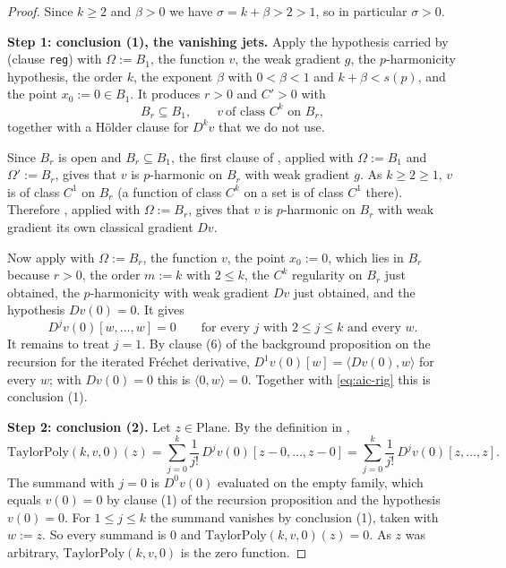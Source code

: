 \begin{proof}
Since $k\ge2$ and $\beta>0$ we have $\sigma=k+\beta>2>1$, so in particular $\sigma>0$.

\medskip\noindent\textbf{Step 1: conclusion (1), the vanishing jets.}
Apply the hypothesis carried by  (clause \texttt{reg}) with
$\Omega:=B_1$, the function $v$, the weak gradient $g$, the $p$-harmonicity hypothesis, the
order $k$, the exponent $\beta$ with $0<\beta<1$ and $k+\beta<s(p)$, and the point
$x_0:=0\in B_1$.  It produces $r>0$ and $C'>0$ with
\[
  B_r\subseteq B_1,\qquad v\ \text{of class }C^{k}\text{ on }B_r,
\]
together with a H\"older clause for $D^{k}v$ that we do not use.

Since $B_r$ is open and $B_r\subseteq B_1$, the first clause of ,
applied with $\Omega:=B_1$ and $\Omega':=B_r$, gives that $v$ is $p$-harmonic on $B_r$ with
weak gradient $g$.  As $k\ge2\ge1$, $v$ is of class $C^{1}$ on $B_r$ (a function of class
$C^{k}$ on a set is of class $C^{1}$ there).  Therefore
, applied with $\Omega:=B_r$, gives that $v$ is $p$-harmonic on
$B_r$ with weak gradient its own classical gradient $Dv$.

Now apply  with $\Omega:=B_r$, the function $v$, the point $x_0:=0$, which
lies in $B_r$ because $r>0$, the order $m:=k$ with $2\le k$, the $C^{k}$ regularity on $B_r$
just obtained, the $p$-harmonicity with weak gradient $Dv$ just obtained, and the hypothesis
$Dv(0)=0$.  It gives
\begin{equation}\label{eq:aic-rig}
  D^{j}v(0)[w,\ldots,w]=0\qquad\text{for every }j\text{ with }2\le j\le k
  \text{ and every }w .
\end{equation}
It remains to treat $j=1$.  By clause (6) of the background proposition on the recursion for
the iterated Fr\'echet derivative, $D^{1}v(0)[w]=\langle Dv(0),w\rangle$ for every $w$; with
$Dv(0)=0$ this is $\langle 0,w\rangle=0$.  Together with \eqref{eq:aic-rig} this is conclusion
(1).

\medskip\noindent\textbf{Step 2: conclusion (2).}
Let $z\in\mathrm{Plane}$.  By the definition in ,
\[
  \mathrm{TaylorPoly}(k,v,0)(z)=\sum_{j=0}^{k}\frac{1}{j!}\,D^{j}v(0)[z-0,\ldots,z-0]
  =\sum_{j=0}^{k}\frac{1}{j!}\,D^{j}v(0)[z,\ldots,z].
\]
The summand with $j=0$ is $D^{0}v(0)$ evaluated on the empty family, which equals $v(0)=0$ by
clause (1) of the recursion proposition and the hypothesis $v(0)=0$.  For $1\le j\le k$ the
summand vanishes by conclusion (1), taken with $w:=z$.  So every summand is $0$ and
$\mathrm{TaylorPoly}(k,v,0)(z)=0$.  As $z$ was arbitrary, $\mathrm{TaylorPoly}(k,v,0)$ is the
zero function.


\end{proof}
